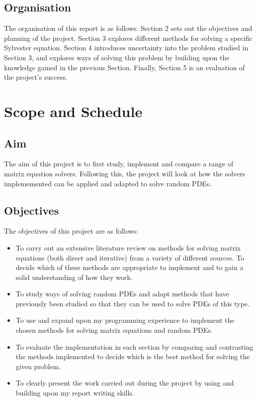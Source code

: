 \documentclass[11pt]{article}
\numberwithin{equation}{section}
\begin{document}
\subsection{Organisation}
The organisation of this report is as follows. Section 2 sets out the objectives and planning of the project. Section 3 explores different methods for solving a specific Sylvester equation. Section 4 introduces uncertainty into the problem studied in Section 3, and explores ways of solving this problem by building upon the knowledge gained in the previous Section. Finally, Section 5 is an evaluation of the project's success.

\newpage

\section{Scope and Schedule}
\subsection{Aim}
The aim of this project is to first study, implement and compare a range of matrix equation solvers. Following this, the project will look at how the solvers implememented can be applied and adapted to solve random PDEs.

\subsection{Objectives}
The objectives of this project are as follows:
\begin{itemize}
\item To carry out an extensive literature review on methods for solving matrix equations (both direct and iterative) from a variety of different sources. To decide which of these methods are appropriate to implement and to gain a solid understanding of how they work.
\item To study ways of solving random PDEs and adapt methods that have previously been studied so that they can be used to solve PDEs of this type. 
\item To use and expand upon my programming experience to implement the chosen methods for solving matrix equations and random PDEs. 
\item To evaluate the implementation in each section by comparing and contrasting the methods implemented to decide which is the best method for solving the given problem.
\item To clearly present the work carried out during the project by using and building upon my report writing skills.
\end{itemize}
\end{document}
